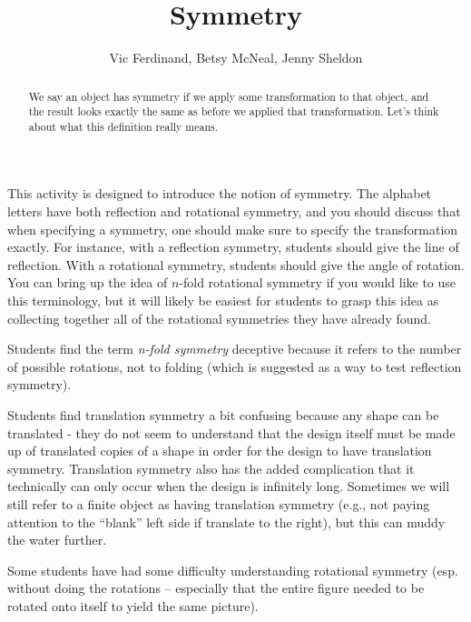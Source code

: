 \documentclass{ximera}
\title{Symmetry}
\author{Vic Ferdinand, Betsy McNeal, Jenny Sheldon}
\begin{document}
\begin{abstract}
We say an object has symmetry if we apply some transformation to that object, and the result looks exactly the same as before we applied that transformation.  Let's think about what this definition really means.
\end{abstract}
\maketitle

\begin{instructorIntro}
This activity is designed to introduce the notion of symmetry.  The alphabet letters have both reflection and rotational symmetry, and you should discuss that when specifying a symmetry, one should make sure to specify the transformation exactly.  For instance, with a reflection symmetry, students should give the line of reflection.  With a rotational symmetry, students should give the angle of rotation.  You can bring up the idea of $n$-fold rotational symmetry if you would like to use this terminology, but it will likely be easiest for students to grasp this idea as collecting together all of the rotational symmetries they have already found.

Students find the term \emph{n-fold symmetry} deceptive because it refers to the number of possible rotations, not to folding (which is suggested as a way to test reflection symmetry).  

Students find translation symmetry a bit confusing because any shape can be translated - they do not seem to understand that the design itself must be made up of translated copies of a shape in order for the design to have translation symmetry.  Translation symmetry also has the added complication that it technically can only occur when the design is infinitely long. Sometimes we will still refer to a finite object as having translation symmetry (e.g., not paying attention to the ``blank'' left side if translate to the right), but this can muddy the water further.

Some students have had some difficulty understanding rotational symmetry (esp. without doing the rotations -- especially that the entire figure needed to be rotated onto itself to yield the same picture). 

\end{instructorIntro}
\end{document}
